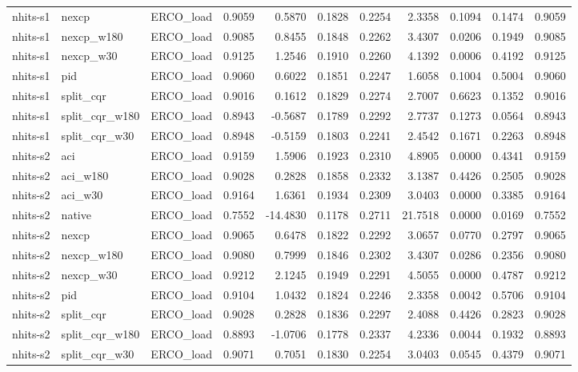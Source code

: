 \begin{tabular}{lllrrrrrrrr}
nhits-s1 & nexcp & ERCO_load & 0.9059 & 0.5870 & 0.1828 & 0.2254 & 2.3358 & 0.1094 & 0.1474 & 0.9059 \\
nhits-s1 & nexcp_w180 & ERCO_load & 0.9085 & 0.8455 & 0.1848 & 0.2262 & 3.4307 & 0.0206 & 0.1949 & 0.9085 \\
nhits-s1 & nexcp_w30 & ERCO_load & 0.9125 & 1.2546 & 0.1910 & 0.2260 & 4.1392 & 0.0006 & 0.4192 & 0.9125 \\
nhits-s1 & pid & ERCO_load & 0.9060 & 0.6022 & 0.1851 & 0.2247 & 1.6058 & 0.1004 & 0.5004 & 0.9060 \\
nhits-s1 & split_cqr & ERCO_load & 0.9016 & 0.1612 & 0.1829 & 0.2274 & 2.7007 & 0.6623 & 0.1352 & 0.9016 \\
nhits-s1 & split_cqr_w180 & ERCO_load & 0.8943 & -0.5687 & 0.1789 & 0.2292 & 2.7737 & 0.1273 & 0.0564 & 0.8943 \\
nhits-s1 & split_cqr_w30 & ERCO_load & 0.8948 & -0.5159 & 0.1803 & 0.2241 & 2.4542 & 0.1671 & 0.2263 & 0.8948 \\
nhits-s2 & aci & ERCO_load & 0.9159 & 1.5906 & 0.1923 & 0.2310 & 4.8905 & 0.0000 & 0.4341 & 0.9159 \\
nhits-s2 & aci_w180 & ERCO_load & 0.9028 & 0.2828 & 0.1858 & 0.2332 & 3.1387 & 0.4426 & 0.2505 & 0.9028 \\
nhits-s2 & aci_w30 & ERCO_load & 0.9164 & 1.6361 & 0.1934 & 0.2309 & 3.0403 & 0.0000 & 0.3385 & 0.9164 \\
nhits-s2 & native & ERCO_load & 0.7552 & -14.4830 & 0.1178 & 0.2711 & 21.7518 & 0.0000 & 0.0169 & 0.7552 \\
nhits-s2 & nexcp & ERCO_load & 0.9065 & 0.6478 & 0.1822 & 0.2292 & 3.0657 & 0.0770 & 0.2797 & 0.9065 \\
nhits-s2 & nexcp_w180 & ERCO_load & 0.9080 & 0.7999 & 0.1846 & 0.2302 & 3.4307 & 0.0286 & 0.2356 & 0.9080 \\
nhits-s2 & nexcp_w30 & ERCO_load & 0.9212 & 2.1245 & 0.1949 & 0.2291 & 4.5055 & 0.0000 & 0.4787 & 0.9212 \\
nhits-s2 & pid & ERCO_load & 0.9104 & 1.0432 & 0.1824 & 0.2246 & 2.3358 & 0.0042 & 0.5706 & 0.9104 \\
nhits-s2 & split_cqr & ERCO_load & 0.9028 & 0.2828 & 0.1836 & 0.2297 & 2.4088 & 0.4426 & 0.2823 & 0.9028 \\
nhits-s2 & split_cqr_w180 & ERCO_load & 0.8893 & -1.0706 & 0.1778 & 0.2337 & 4.2336 & 0.0044 & 0.1932 & 0.8893 \\
nhits-s2 & split_cqr_w30 & ERCO_load & 0.9071 & 0.7051 & 0.1830 & 0.2254 & 3.0403 & 0.0545 & 0.4379 & 0.9071 \\

\end{tabular}
